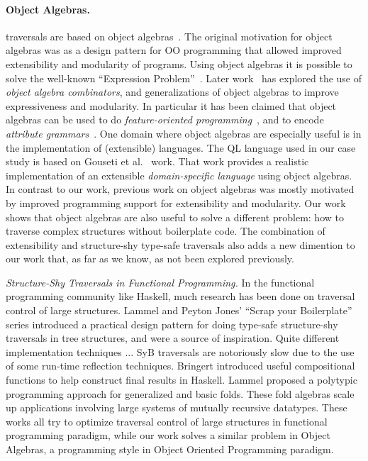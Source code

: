 \paragraph{Object Algebras.} \name traversals are based on
object algebras~\cite{bruno12oa}. The original motivation for object
algebras was as a design pattern for OO programming that allowed
improved extensibility and modularity of programs.  Using object
algebras it is possible to solve the well-known ``Expression
Problem''~\cite{wadler98expression-problem}.  Later
work~\cite{oliveira13fop,rendel14attributes} has explored the use of
\emph{object algebra combinators}, and generalizations of object
algebras to improve expressiveness and modularity. In particular it
has been claimed that object algebras can be used to do
\emph{feature-oriented programming}~\cite{oliveira13fop}, and to
encode \emph{attribute grammars}~\cite{rendel14attributes}. One domain
where object algebras are especially useful is in the implementation of
(extensible) languages.  The QL language used in our case study is
based on Gouseti et al.~\cite{gouseti14extensible} work. That work
provides a realistic implementation of an extensible
\emph{domain-specific language} using object algebras. In contrast to
our work, previous work on object algebras was mostly motivated by
improved programming support for extensibility and
modularity. Our work shows that object algebras are also useful 
to solve a different problem: how to traverse complex structures 
without boilerplate code. The combination of extensibility and 
structure-shy type-safe traversals also adds a new dimention to 
our work that, as far as we know, as not been explored previously.



\textit{Structure-Shy Traversals in Functional Programming.} 
In the functional programming community like Haskell, much research
has been done on traversal control of large structures. Lammel and
Peyton Jones' ``Scrap your Boilerplate''~\cite{ralf03syb,?,?} series
introduced a practical design pattern for doing type-safe
structure-shy traversals in tree structures, and were a source 
of inspiration. Quite different implementation techniques ... 
SyB traversals are notoriously slow due to the use of some run-time 
reflection techniques.
Bringert\cite{bjorn08acf} introduced useful compositional
functions to help construct final results in
Haskell. Lammel\cite{ralf00banana} proposed a polytypic programming
approach for generalized and basic folds. These fold algebras scale up
applications involving large systems of mutually recursive
datatypes. These works all try to optimize traversal control of large
structures in functional programming paradigm, while our work solves a
similar problem in Object Algebras, a programming style in Object
Oriented Programming paradigm.

